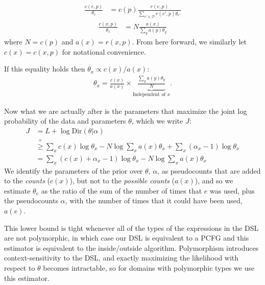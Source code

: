 \documentclass{article}
\begin{document}
\begin{align*}
 \frac{c(e, p)}{\theta_e} &= c(p)\frac{r(e, p)}{\sum_{e'\in\mathcal{D}} r(e', p)\theta_{e'}}
\end{align*}
\begin{align}
  \frac{c(x,p)}{\theta_x} &= N\frac{a(x)}{\sum_y a(y)\theta_y}
\end{align}
where $N=c(p)$ and $a(x) = r(x, p)$. From here forward, we similarly let
$c(x)=c(x,p)$ for notational convenience.

If this equality holds then $\theta_x \propto c(x)/a(x)$:
\begin{align}
  \theta_x = \frac{c(x)}{a(x)}\times \underbrace{\frac{\sum_y a(y)\theta_y}{N}}_{\text{Independent of $x$}}.
\end{align}

Now what we are actually after is the parameters that maximize the joint log probability of the data and parameters $\theta$, which we  write $J$:
\begin{align}
  J& = L + \log \text{Dir}(\theta|\alpha)\\
  &\stackrel{+}{\geq } \sum_x c(x)\log \theta_x - N \log \sum_x a(x)\theta_x  + \sum_x(\alpha_x - 1)\log \theta_x\\
  & = \sum_x (c(x) + \alpha_x - 1)\log \theta_x -  N \log \sum_x a(x)\theta_x
\end{align}
We identify the parameters of the prior over $\theta$, $\alpha$, as  pseudocounts that are added to the \emph{counts} ($c(x)$), but not to the \emph{possible counts} ($a(x)$),
and so we estimate $\theta_e$ as the ratio of the sum of the number of times that $e$ was used, plus the pseudocounts $\alpha$, with the number of times that it could have been used, $a(e)$.



This lower bound is tight whenever all
of the types of the expressions in the DSL are not polymorphic, in which case our DSL is equivalent to a PCFG
and this estimator is equivalent to the inside/outside algorithm.
Polymorphism introduces context-sensitivity to the DSL,
and exactly maximizing the likelihood with respect to $\theta$
becomes intractable,
so for domains with polymorphic types we use this estimator.
\end{document}
